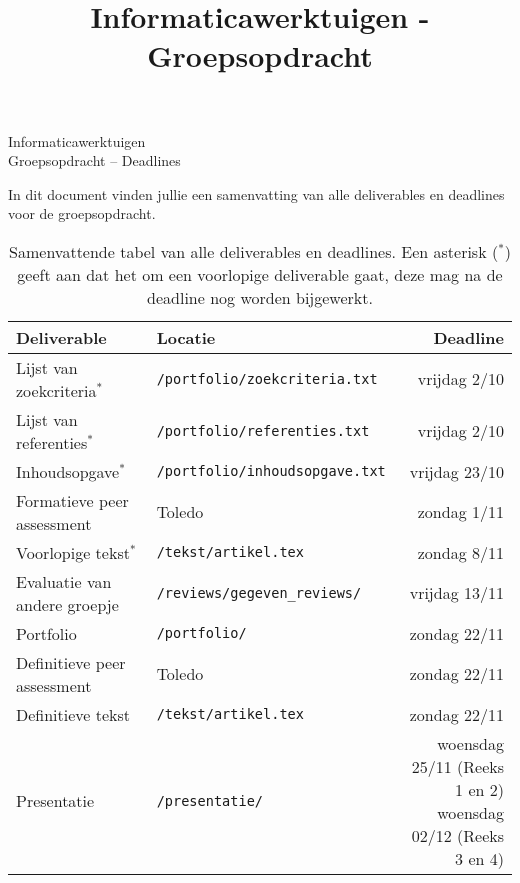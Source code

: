 \documentclass[a4paper]{article}
\title{Informaticawerktuigen - Groepsopdracht}
\begin{document}
\begin{center}
  \huge Informaticawerktuigen \\
  \Huge Groepsopdracht -- Deadlines
\end{center}
\vspace{1em}


In dit document vinden jullie een samenvatting van alle deliverables en deadlines voor de groepsopdracht.

\begin{table}[h]
    \renewcommand{\arraystretch}{1.5}
    \begin{center}
        \begin{tabular}{ l | l r }
            \rowcolor{gray!50}
            \textbf{Deliverable}            & \textbf{Locatie}                      & \textbf{Deadline} \\ \hline
            Lijst van zoekcriteria$^{\ast}$ & \texttt{/portfolio/zoekcriteria.txt}  & vrijdag 2/10 \\
            Lijst van referenties$^{\ast}$  & \texttt{/portfolio/referenties.txt}   & vrijdag 2/10 \\
            Inhoudsopgave$^{\ast}$          & \texttt{/portfolio/inhoudsopgave.txt} & vrijdag 23/10 \\
            Formatieve peer assessment      & Toledo                                & zondag 1/11 \\
            Voorlopige tekst$^{\ast}$       & \texttt{/tekst/artikel.tex}           & zondag 8/11 \\
            Evaluatie van andere groepje    & \texttt{/reviews/gegeven\_reviews/}   & vrijdag 13/11 \\
            Portfolio                       & \texttt{/portfolio/}                  & zondag 22/11 \\
            Definitieve peer assessment     & Toledo                                & zondag 22/11 \\
            Definitieve tekst               & \texttt{/tekst/artikel.tex}           & zondag 22/11 \\
            Presentatie                     & \texttt{/presentatie/}                & \makecell{woensdag 25/11 (Reeks 1 en 2) \\ woensdag 02/12 (Reeks 3 en 4)} \\
        \end{tabular}
        \caption{
            Samenvattende tabel van alle deliverables en deadlines.
            Een asterisk ($^{\ast}$) geeft aan dat het om een voorlopige deliverable gaat, deze mag na de deadline nog worden bijgewerkt.
        }
    \end{center}
\end{table}


\end{document}
